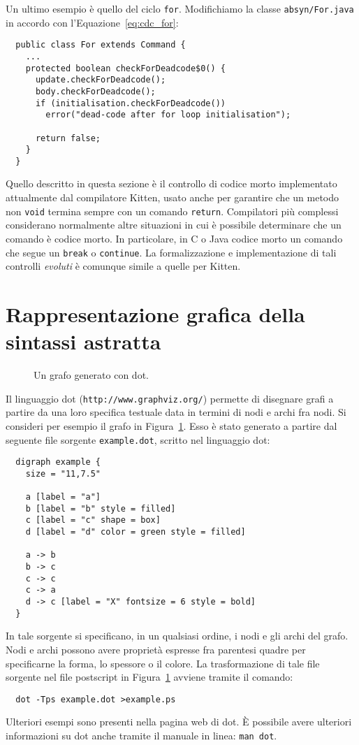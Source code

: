 Un ultimo esempio \`e quello del ciclo \texttt{for}.
Modifichiamo la classe \texttt{absyn/For.java} in accordo
con l'Equazione~\eqref{eq:cdc_for}:
%
\begin{verbatim}
  public class For extends Command {
    ...
    protected boolean checkForDeadcode$0() {
      update.checkForDeadcode();
      body.checkForDeadcode();
      if (initialisation.checkForDeadcode())
        error("dead-code after for loop initialisation");

      return false;
    }
  }
\end{verbatim}

Quello descritto in questa sezione \`e il controllo di codice morto
implementato attualmente dal compilatore Kitten, usato anche per garantire che
un metodo non \texttt{void} termina sempre con un comando \texttt{return}.
Compilatori pi\`u complessi considerano normalmente altre situazioni in cui \`e
possibile determinare che un comando \`e codice morto. In particolare, in C o
Java \e codice morto un comando che segue un \texttt{break} o
\texttt{continue}.
La formalizzazione e implementazione di tali controlli \emph{evoluti}
\`e comunque simile a quelle per Kitten.
%
\section{Rappresentazione grafica della sintassi astratta}
  \label{sec:graphical_abstract_syntax}
%
\begin{figure}
\begin{center}
\end{center}
\caption{Un grafo generato con dot.}\label{fig:dot_example}
\end{figure}
%
Il linguaggio dot (\texttt{http://www.graphviz.org/}) permette di
disegnare grafi a partire da una loro specifica testuale data in
termini di nodi e archi fra nodi. Si consideri per esempio il grafo
in Figura~\ref{fig:dot_example}. Esso \`e stato generato a partire dal
seguente file sorgente \texttt{example.dot}, scritto nel linguaggio dot:
%
\begin{verbatim}
  digraph example {
    size = "11,7.5"

    a [label = "a"]
    b [label = "b" style = filled]
    c [label = "c" shape = box]
    d [label = "d" color = green style = filled]

    a -> b
    b -> c
    c -> c
    c -> a
    d -> c [label = "X" fontsize = 6 style = bold]
  }
\end{verbatim}
%
In tale sorgente si specificano, in un qualsiasi ordine, i nodi e
gli archi del grafo. Nodi e archi possono avere propriet\`a espresse fra
parentesi quadre per specificarne la forma, lo spessore o il colore.
La trasformazione di tale file sorgente nel file postscript in
Figura~\ref{fig:dot_example} avviene tramite il comando:
%
\begin{verbatim}
  dot -Tps example.dot >example.ps
\end{verbatim}
%
Ulteriori esempi sono presenti nella pagina web di dot.
\`E possibile avere ulteriori informazioni su dot anche tramite
il manuale in linea: \texttt{man dot}.

